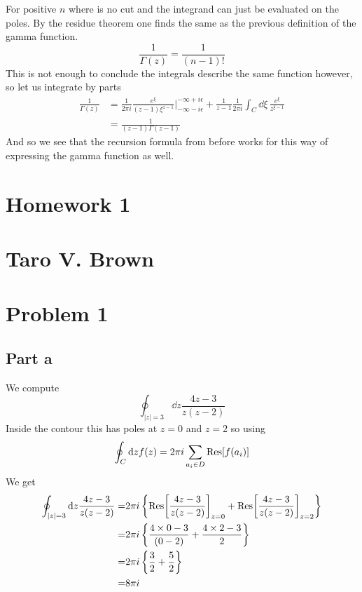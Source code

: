 \documentclass[a4paper,12pt]{article}
\begin{document}
For positive $n$ where is no cut and the integrand can just be evaluated on the poles. By the residue theorem one finds the same as the previous definition of the gamma function.
\begin{equation}
	\frac{1}{\Gamma(z)}=\frac{1}{(n-1)!}
\end{equation}
 This is not enough to conclude the integrals describe the same function however, so let us integrate by parts
\begin{equation}
\begin{aligned}
	\frac{1}{\Gamma(z)}&=\frac{1}{2\pi i}\frac{e^{\xi}}{(z-1)\xi^{z-1}}\Big|_{-\infty-i\epsilon}^{-\infty+i\epsilon}
+
\frac{1}{z-1}\frac{1}{2\pi i}\int_C \dd \xi\, \frac{e^\xi}{z^{\xi-1}}\\
&=\frac{1}{(z-1)\Gamma(z-1)}
\end{aligned}
\end{equation}
And so we see that the recursion formula from before works for this way of expressing the gamma function as well.
\newpage
\section*{Homework 1\\\\
Taro V. Brown}\vspace*{1cm}
\section*{Problem 1}
\subsection*{Part a}
We compute
\begin{equation}
\oint_{|z|=3} \dd z\frac{4z-3}{z(z-2)}
\end{equation}
Inside the contour this has poles at $z=0$ and $z=2$ so using 
\begin{equation}
	\oint _C \dd z  f(z)=2\pi i \sum_{a_i\in D}\Res[f(a_i)]
\end{equation}
We get
\begin{equation}
\begin{aligned}
	\oint_{|z|=3} \dd z\frac{4z-3}{z(z-2)}=&2\pi i \left\{\Res[\frac{4z-3}{z(z-2)}]_{z=0}+\Res[\frac{4z-3}{z(z-2)}]_{z=2}\right\}\\
	=&2\pi i \left\{\frac{4\times 0-3}{(0-2)}+\frac{4\times 2-3}{2}\right\}\\
	=&2\pi i \left\{\frac{3}{2}+\frac{5}{2}\right\}\\	
	=&8\pi i 
\end{aligned}
\end{equation}
\end{document}
